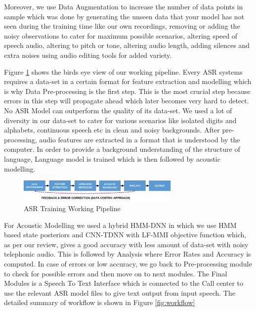 \documentclass[3p,times]{elsarticle}
\begin{document}
Moreover, we use Data Augmentation to increase the number of data points in sample which was done by generating the unseen data that your model has not seen during the training time like our own recordings, removing or adding the noisy observations to cater for maximum possible scenarios, altering speed of speech audio, altering to pitch or tone, altering audio length, adding silences and extra noises using audio editing tools \cite{audacity_linux_nodate} for added variety.

Figure \ref{fig:working_pipeline_short} shows the birds eye view of our working pipeline. Every ASR systems requires a data-set in a certain format for feature extraction and modelling which is why Data Pre-processing is the first step. This is the most crucial step because errors in this step will propagate ahead which later becomes very hard to detect. No ASR Model can outperform the quality of its data-set. We used a lot of diversity in our data-set to cater for various scenarios like isolated digits and alphabets, continuous speech etc in clean and noisy backgrounds. After pre-processing, audio features are extracted in a format that is understood by the computer. In order to provide a background understanding of the structure of language, Language model is trained which is then followed by acoustic modelling. 

\begin{figure}[h]
    \centering
    \includegraphics[width=0.7\textwidth]{img/working-pipeline-short.png}
    \caption{ASR Training Working Pipeline}
    \label{fig:working_pipeline_short}
\end{figure}


For Acoustic Modelling we used a hybrid HMM-DNN in which we use HMM based state posteriors and CNN-TDNN with LF-MMI objective function which, as per our review, gives a good accuracy with less amount of data-set with noisy telephonic audio. This is followed by Analysis where Error Rates and Accuracy is computed. In case of errors or low accuracy, we go back to Pre-processing module to check for possible errors and then move on to next modules. The Final Modules is a Speech To Text Interface which is connected to the Call center to use the relevant ASR model files to give text output from input speech. The detailed summary of workflow is shown in Figure 
\ref{fig:workflow}
\end{document}
